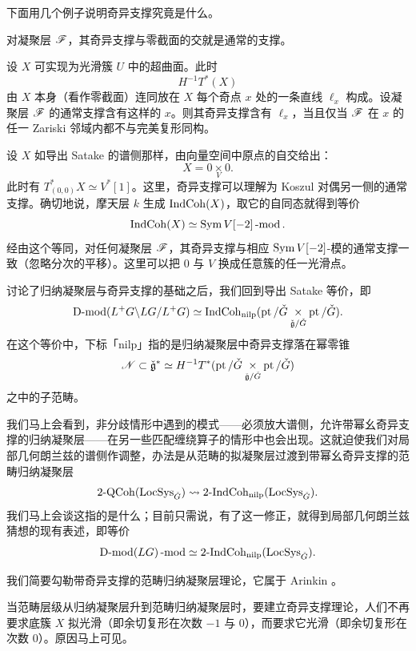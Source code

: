 下面用几个例子说明奇异支撑究竟是什么。

\begin{ex}\label{ex:singsupp1}对凝聚层 $\mathscr{F}$，其奇异支撑与零截面的交就是通常的支撑。\end{ex}

\begin{ex}\label{ex:singsupp2}设 $X$ 可实现为光滑簇 $U$ 中的超曲面。此时 $$H^{-1} T^*(X)$$ 由 $X$ 本身（看作零截面）连同放在 $X$ 每个奇点 $x$ 处的一条直线 $\ell_x$ 构成。设凝聚层 $\mathscr{F}$ 的通常支撑含有这样的 $x$。则其奇异支撑含有 $\ell_x$，当且仅当 $\mathscr{F}$ 在 $x$ 的任一 Zariski 邻域内都不与完美复形同构。\end{ex}

\begin{ex}设 $X$ 如导出 Satake 的谱侧那样，由向量空间中原点的自交给出：$$X = 0 \underset V \times 0.$$ 此时有 $T^*_{(0,0)} X \simeq V^*[1]$。这里，奇异支撑可以理解为 Koszul 对偶另一侧的通常支撑。确切地说，摩天层 $k$ 生成 $\operatorname{IndCoh}(X)$，取它的自同态就得到等价
\[
    \operatorname{IndCoh}(X) \simeq \operatorname{Sym} V[-2] \operatorname{-mod}.
\]
经由这个等同，对任何凝聚层 $\mathscr{F}$，其奇异支撑与相应 $\operatorname{Sym} V[-2]$-模的通常支撑一致（忽略分次的平移）。这里可以把 $0$ 与 $V$ 换成任意簇的任一光滑点。\end{ex}

\ssszh 讨论了归纳凝聚层与奇异支撑的基础之后，我们回到导出 Satake 等价，即
\begin{equation} \label{e:der} \operatorname{D-mod}(L^+G \backslash LG / L^+G) \simeq
\operatorname{IndCoh}_{\operatorname{nilp}}( \operatorname{pt} / \check{G}  \underset{
	\check{\mathfrak{g}} / \check{G}} \times \operatorname{pt} / \check{G}). \end{equation}
在这个等价中，下标「nilp」指的是归纳凝聚层中奇异支撑落在幂零锥
$$\mathscr{N} \subset \check{\mathfrak{g}}^* \simeq
H^{-1}T^*( \operatorname{pt}/\check{G} \underset {\check{\mathfrak{g}} / \check{G}}   \times \operatorname{pt}/\check{G})$$
之中的子范畴。

\ssszh 我们马上会看到，非分歧情形中遇到的模式——必须放大谱侧，允许带幂幺奇异支撑的归纳凝聚层——在另一些匹配缠绕算子的情形中也会出现。这就迫使我们对局部几何朗兰兹的谱侧作调整，办法是从范畴的拟凝聚层过渡到带幂幺奇异支撑的范畴归纳凝聚层
\[
\operatorname{2-QCoh}(\operatorname{LocSys}_{\check{G}}) \rightsquigarrow \operatorname{2-IndCoh}_{\operatorname{nilp}}(\operatorname{LocSys}_{\check{G}}).
\]
我们马上会谈这指的是什么；目前只需说，有了这一修正，就得到局部几何朗兰兹猜想的现有表述，即等价
\begin{equation}
\label{e:loclang}\operatorname{D-mod}(LG)\operatorname{-mod} \simeq \operatorname{2-IndCoh}_{\operatorname{nilp}}(\operatorname{LocSys}_{\check{G}}).
\end{equation}

\ssszh 我们简要勾勒带奇异支撑的范畴归纳凝聚层理论，它属于 Arinkin \cite{arinkinindcohcats}。

当范畴层级从归纳凝聚层升到范畴归纳凝聚层时，要建立奇异支撑理论，人们不再要求底簇 $X$ 拟光滑（即余切复形在次数 $-1$ 与 $0$），而要求它光滑（即余切复形在次数 $0$）。原因马上可见。

